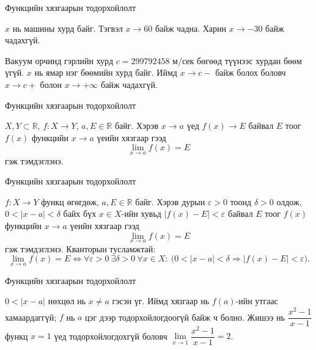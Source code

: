 \begin{frame}[allowframebreaks]{Функцийн хязгаарын тодорхойлолт}
\begin{example}
$x$ нь машины хурд байг. Тэгвэл $x \to 60$ байж чадна. Харин $x \to -30$ байж чадахгүй.

Вакуум орчинд гэрлийн хурд $c=299792458$ м/сек бөгөөд түүнээс хурдан бөөм үгүй. $x$ нь ямар нэг бөөмийн хурд байг.
Иймд $x \to c-$ байж болох боловч $x \to c+$ болон $x \to +\infty$ байж чадахгүй.
\end{example}
\end{frame}

\begin{frame}[allowframebreaks]{Функцийн хязгаарын тодорхойлолт}
\begin{definition}
$X,Y \subset \mathbb{R}$, $f:X \to Y$, $a,E \in \mathbb{R}$ байг.
Хэрэв $x \to a$ үед $f(x) \to E$ байвал $E$ тоог $f(x)$ функцийн $x\to a$ үеийн хязгаар гээд
\[
\lim_{x \to a} f(x) = E
\]
гэж тэмдэглэнэ.
\end{definition}
\end{frame}

\begin{frame}[allowframebreaks]{Функцийн хязгаарын тодорхойлолт}
\begin{definition}
$f:X \to Y$ функц өгөгдөж, $a,E \in \mathbb{R}$ байг.
Хэрэв дурын $\varepsilon>0$ тоонд $\delta>0$ олдож, $0<|x-a|<\delta$ байх бүх $x\in X$-ийн хувьд $|f(x)-E|<\varepsilon$ байвал $E$ тоог $f(x)$ функцийн $x\to a$ үеийн хязгаар гээд
\[
\lim_{x \to a} f(x) = E
\]
гэж тэмдэглэнэ. Кванторын тусламжтай:
\[
\lim_{x \to a} f(x) = E \iff \forall\varepsilon>0\ \exists\delta>0\ \forall x\in X:\ \bigl(0<|x-a|<\delta\Rightarrow|f(x)-E|<\varepsilon\bigr).
\]
\end{definition}
\end{frame}

\begin{frame}[allowframebreaks]{Функцийн хязгаарын тодорхойлолт}
\begin{remark}
$0<|x-a|$ нөхцөл нь $x\neq a$ гэсэн үг. Иймд хязгаар нь $f(a)$-ийн утгаас хамаардаггүй;
$f$ нь $a$ цэг дээр тодорхойлогдоогүй байж ч болно. Жишээ нь $\dfrac{x^2-1}{x-1}$ функц $x=1$ үед
тодорхойлогдохгүй боловч $\lim\limits_{x\to1}\dfrac{x^2-1}{x-1}=2$.
\end{remark}
\end{frame}

